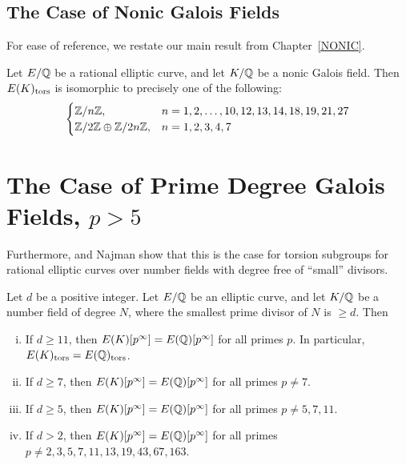 \subsection{The Case of Nonic Galois Fields}

For ease of reference, we restate our main result from Chapter~\ref{NONIC}.

\begin{thm} \label{thm:nonicclassification}
Let $E/\mathbb{Q}$ be a rational elliptic curve, and let $K/\mathbb{Q}$ be a nonic Galois field. Then $E(K)_{\text{tors}}$ is isomorphic to precisely one of the following:
	\[
	\begin{cases}
	\mathbb{Z}/n\mathbb{Z}, & n= 1, 2, \ldots, 10, 12, 13, 14, 18, 19, 21, 27 \\
	\mathbb{Z}/2\mathbb{Z} \oplus \mathbb{Z}/2n\mathbb{Z}, & n= 1, 2, 3, 4, 7
	\end{cases}
	\]
\end{thm}





\section{The Case of Prime Degree Galois Fields, $p>5$}

Furthermore, \gonjim{} and Najman show that this is the case for torsion subgroups for rational elliptic curves over number fields with degree free of ``small'' divisors.


\begin{thm}
Let $d$ be a positive integer. Let $E/\mathbb{Q}$ be an elliptic curve, and let $K/\mathbb{Q}$ be a number field of degree $N$, where the smallest prime divisor of $N$ is $\geq d$. Then 
	\begin{enumerate}[(i)]
	\item If $d \geq 11$, then $E(K)[p^\infty]= E(\mathbb{Q})[p^\infty]$ for all primes $p$. In particular, $E(K)_{\text{tors}}= E(\mathbb{Q})_{\text{tors}}$. 
	\item If $d \geq 7$, then $E(K)[p^\infty]= E(\mathbb{Q})[p^\infty]$ for all primes $p \neq 7$.
	\item If $d \geq 5$, then $E(K)[p^\infty]= E(\mathbb{Q})[p^\infty]$ for all primes $p \neq 5, 7, 11$.
	\item If $d > 2$, then $E(K)[p^\infty]= E(\mathbb{Q})[p^\infty]$ for all primes $p \neq 2, 3, 5, 7, 11, 13, 19, 43, 67, 163$. 
	\end{enumerate}
\end{thm}


